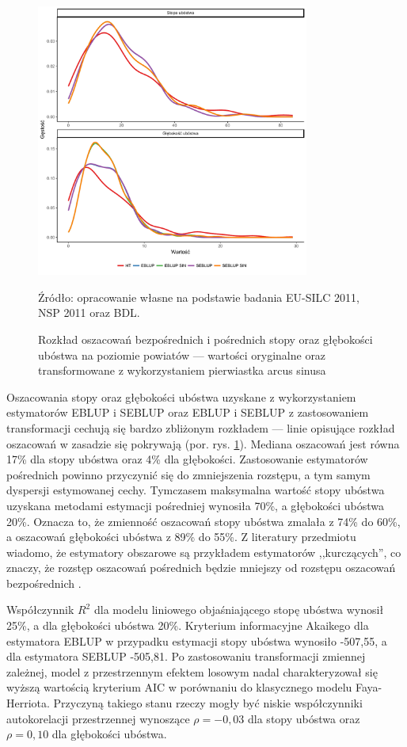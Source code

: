 \begin{figure}[htp]
\centering
\includegraphics[width=0.8\textwidth]{04_wykresy/fh_powiat-1.pdf}
\caption{Rozkład oszacowań bezpośrednich i pośrednich stopy oraz głębokości ubóstwa na poziomie powiatów --- wartości oryginalne oraz transformowane z wykorzystaniem pierwiastka arcus sinusa}
\small{Źródło: opracowanie własne na podstawie badania EU-SILC 2011, NSP 2011 oraz BDL.}
\label{fig:fh_powiat}
\end{figure}

Oszacowania stopy oraz głębokości ubóstwa uzyskane z wykorzystaniem estymatorów EBLUP i SEBLUP oraz EBLUP i SEBLUP z zastosowaniem transformacji cechują się bardzo zbliżonym rozkładem --- linie opisujące rozkład oszacowań w zasadzie się pokrywają (por. rys. \ref{fig:fh_powiat}). Mediana oszacowań jest równa 17\% dla stopy ubóstwa oraz 4\% dla głębokości. Zastosowanie estymatorów pośrednich powinno przyczynić się do zmniejszenia rozstępu, a tym samym dyspersji estymowanej cechy. Tymczasem maksymalna wartość stopy ubóstwa uzyskana metodami estymacji pośredniej wynosiła 70\%, a głębokości ubóstwa 20\%. Oznacza to, że zmienność oszacowań stopy ubóstwa zmalała z 74\% do 60\%, a oszacowań głębokości ubóstwa z 89\% do 55\%. Z literatury przedmiotu wiadomo, że estymatory obszarowe są przykładem estymatorów ,,kurczących'', co znaczy, że rozstęp oszacowań pośrednich będzie mniejszy od rozstępu oszacowań bezpośrednich \citep{chakraborty2016,rao2015}.

Współczynnik $R^2$ dla modelu liniowego objaśniającego stopę ubóstwa wynosił 25\%, a dla głębokości ubóstwa 20\%. Kryterium informacyjne Akaikego dla estymatora EBLUP w przypadku estymacji stopy ubóstwa wynosiło -507,55, a dla estymatora SEBLUP -505,81. Po zastosowaniu transformacji zmiennej zależnej, model z przestrzennym efektem losowym nadal charakteryzował się wyższą wartością kryterium AIC w porównaniu do klasycznego modelu Faya-Herriota. Przyczyną takiego stanu rzeczy mogły być niskie współczynniki autokorelacji przestrzennej wynoszące $\rho=-0,03$ dla stopy ubóstwa oraz $\rho=0,10$ dla głębokości ubóstwa.

